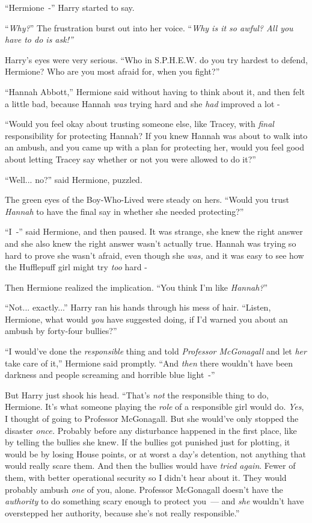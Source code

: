 ``Hermione~-'' Harry started to say.

``\emph{Why?}'' The frustration burst out into her voice. ``\emph{Why is it so awful? All you have to do is ask!''}

Harry's eyes were very serious. ``Who in S.P.H.E.W. do you try hardest to defend, Hermione? Who are you most afraid for, when you fight?''

``Hannah Abbott,'' Hermione said without having to think about it, and then felt a little bad, because Hannah \emph{was} trying hard and she \emph{had} improved a lot -

``Would you feel okay about trusting someone else, like Tracey, with \emph{final} responsibility for protecting Hannah? If you knew Hannah was about to walk into an ambush, and you came up with a plan for protecting her, would you feel good about letting Tracey say whether or not you were allowed to do it?''

``Well... no?'' said Hermione, puzzled.

The green eyes of the Boy-Who-Lived were steady on hers. ``Would you trust \emph{Hannah} to have the final say in whether she needed protecting?''

``I~-'' said Hermione, and then paused. It was strange, she knew the right answer and she also knew the right answer wasn't actually true. Hannah was trying so hard to prove she wasn't afraid, even though she \emph{was,} and it was easy to see how the Hufflepuff girl might try \emph{too} hard -

Then Hermione realized the implication. ``You think I'm like \emph{Hannah?}''

``Not... exactly...'' Harry ran his hands through his mess of hair. ``Listen, Hermione, what would \emph{you} have suggested doing, if I'd warned you about an ambush by forty-four bullies?''

``I would've done the \emph{responsible} thing and told \emph{Professor McGonagall} and let \emph{her} take care of it,'' Hermione said promptly. ``And \emph{then} there wouldn't have been darkness and people screaming and horrible blue light~-''

But Harry just shook his head. ``That's \emph{not} the responsible thing to do, Hermione. It's what someone playing the \emph{role} of a responsible girl would do. \emph{Yes}, I thought of going to Professor McGonagall. But she would've only stopped the disaster \emph{once.} Probably before any disturbance happened in the first place, like by telling the bullies she knew. If the bullies got punished just for plotting, it would be by losing House points, or at worst a day's detention, not anything that would really scare them. And then the bullies would have \emph{tried again}. Fewer of them, with better operational security so I didn't hear about it. They would probably ambush \emph{one} of you, alone. Professor McGonagall doesn't have the \emph{authority} to do something scary enough to protect you~--- and \emph{she} wouldn't have overstepped her authority, because she's not really responsible.''

